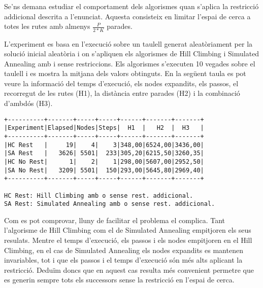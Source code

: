 
Se'ns demana estudiar el comportament dels algorismes quan s'aplica la restricció addicional descrita a l'enunciat. Aquesta consisteix en limitar l'espai de cerca a totes les rutes amb almenys $\frac{P}{2*K}$ parades.

L'experiment es basa en l'execució sobre un taulell generat aleatòriament per la solució inicial aleatòria i on s'apliquen els algorismes de Hill Climbing i Simulated Annealing amb i sense restriccions. Els algorismes s'executen 10 vegades sobre el taulell i es mostra la mitjana dels valors obtinguts. En la següent taula es pot veure la informació del temps d'execució, els nodes expandits, els passos, el recorregut de les rutes (H1), la distància entre parades (H2) i la combinació d'ambdós (H3).

\begin{verbatim}
+----------+-------+-----+-----+------+-------+-------+
|Experiment|Elapsed|Nodes|Steps|  H1  |   H2  |  H3   |
+----------+-------+-----+-----+------+-------+-------+
|HC Rest   |     19|    4|    3|348,00|6524,00|3436,00|
|SA Rest   |   3626| 5501|  233|305,20|6215,50|3260,35|
|HC No Rest|      1|    2|    1|298,00|5607,00|2952,50|
|SA No Rest|   3209| 5501|  150|293,00|5645,80|2969,40|
+----------+-------+-----+-----+------+-------+-------+
                                               
HC Rest: Hill Climbing amb o sense rest. addicional.
SA Rest: Simulated Annealing amb o sense rest. addicional.
\end{verbatim}  

Com es pot comprovar, lluny de facilitar el problema el complica. Tant l'algorisme de Hill Climbing com el de Simulated Annealing empitjoren els seus resulats. Mentre el temps d'execució, els passos i els nodes empitjoren en el Hill Climbing, en el cas de Simulated Annealing els nodes expandits es mantenen invariables, tot i que els passos i el temps d'execució són més alts aplicant la restricció. Deduïm doncs que en aquest cas resulta més convenient permetre que es generin sempre tots els successors sense la restricció en l'espai de cerca.                                    